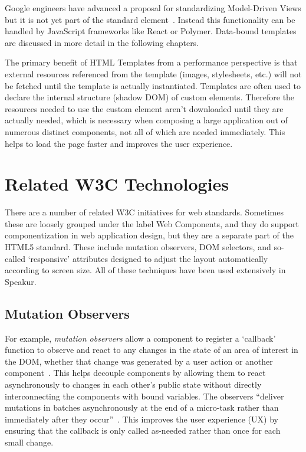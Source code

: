 Google engineers have advanced a proposal for standardizing 
Model-Driven Views
but it is not yet part of the standard  element~\cite{googledevelopers2014}.
Instead this functionality can be handled by JavaScript frameworks like React or Polymer.
Data-bound templates are discussed in more detail in the following chapters.

The primary benefit of HTML Templates from a performance perspective is that external resources referenced from the template (images, stylesheets, etc.) will not be fetched until the template is actually instantiated.
Templates are often used to declare the internal structure (shadow DOM) of custom elements. 
Therefore the resources needed to use the custom element aren't downloaded until they are actually needed, which is necessary when composing a large application out of numerous distinct components, 
not all of which are needed immediately.
This helps to load the page faster and improves the user experience.

\section{Related W3C Technologies}
There are a number of related W3C initiatives for web standards. 
Sometimes these are loosely grouped under the label Web Components,
and they do support componentization in web application design, 
but they are a separate part of the HTML5 standard.
These include mutation observers, 
DOM selectors, 
and so-called `responsive' attributes designed to adjust the layout automatically according to screen size.
All of these techniques have been used extensively in Speakur.

\subsection{Mutation Observers}
\label{sec:bgmutation}
For example, \textit{mutation observers}
allow a component to register a `callback' function to observe and react to any changes in the state of an area of interest in the DOM, 
whether that change was generated by a user action or another 
component~\cite{w3ccontributors2014}.
This helps decouple components by allowing them to react asynchronously to changes in each other's public state without directly interconnecting the components with bound variables.
The observers ``deliver mutations in batches asynchronously at the end of a micro-task rather than immediately after they occur''~\cite{addyosmani2014}.
This improves the user experience (UX) by ensuring that the callback is only called as-needed rather than once for each small change.

